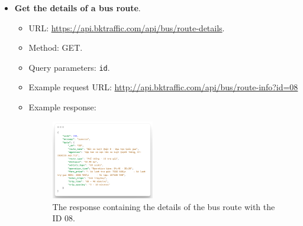 \begin{itemize}
    \item \textbf{Get the details of a bus route}.
    \begin{itemize}
        \item URL: \url{https://api.bktraffic.com/api/bus/route-details}.
        \item Method: GET.
        \item Query parameters: \lstinline{id}.
        \item Example request URL: \url{http://api.bktraffic.com/api/bus/route-info?id=08}
        \item Example response:
        \begin{figure}[H]
            \centering
            \includegraphics[width=0.45\textwidth]{assets/images/Implementation/route_details_response.png}
            \caption{The response containing the details of the bus route with the ID 08.}
            \label{fig:route_details_response}
        \end{figure}
    \end{itemize}


\end{itemize}
